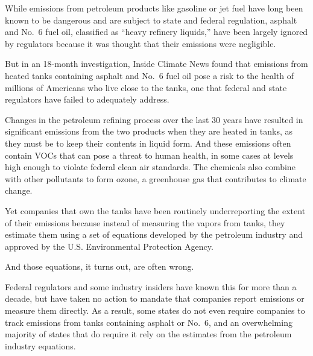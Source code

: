 \documentclass[
]{book}
\begin{document}
While emissions from petroleum products like gasoline or jet fuel have long been known to be dangerous and are subject to state and federal regulation, asphalt and No.~6 fuel oil, classified as ``heavy refinery liquids,'' have been largely ignored by regulators because it was thought that their emissions were negligible.

But in an 18-month investigation, Inside Climate News found that emissions from heated tanks containing asphalt and No.~6 fuel oil pose a risk to the health of millions of Americans who live close to the tanks, one that federal and state regulators have failed to adequately address.

Changes in the petroleum refining process over the last 30 years have resulted in significant emissions from the two products when they are heated in tanks, as they must be to keep their contents in liquid form. And these emissions often contain VOCs that can pose a threat to human health, in some cases at levels high enough to violate federal clean air standards. The chemicals also combine with other pollutants to form ozone, a greenhouse gas that contributes to climate change.

Yet companies that own the tanks have been routinely underreporting the extent of their emissions because instead of measuring the vapors from tanks, they estimate them using a set of equations developed by the petroleum industry and approved by the U.S. Environmental Protection Agency.

And those equations, it turns out, are often wrong.

Federal regulators and some industry insiders have known this for more than a decade, but have taken no action to mandate that companies report emissions or measure them directly. As a result, some states do not even require companies to track emissions from tanks containing asphalt or No.~6, and an overwhelming majority of states that do require it rely on the estimates from the petroleum industry equations.
\end{document}
